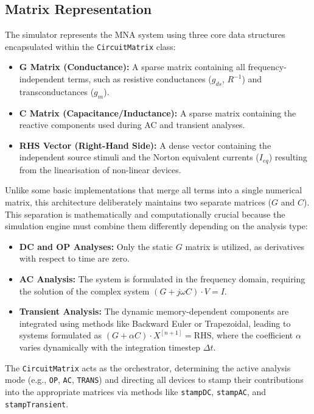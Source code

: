 \subsection{Matrix Representation}
The simulator represents the MNA system using three core data structures encapsulated within the \texttt{CircuitMatrix} class:
\begin{itemize}
    \item \textbf{G Matrix (Conductance):} A sparse matrix containing all frequency-independent terms, such as resistive conductances ($g_{ds}$, $R^{-1}$) and transconductances ($g_m$).
    \item \textbf{C Matrix (Capacitance/Inductance):} A sparse matrix containing the reactive components used during AC and transient analyses.
    \item \textbf{RHS Vector (Right-Hand Side):} A dense vector containing the independent source stimuli and the Norton equivalent currents ($I_{eq}$) resulting from the linearisation of non-linear devices.
\end{itemize}

Unlike some basic implementations that merge all terms into a single numerical matrix, this architecture deliberately maintains two separate matrices ($G$ and $C$). This separation is mathematically and computationally crucial because the simulation engine must combine them differently depending on the analysis type:
\begin{itemize}
    \item \textbf{DC and OP Analyses:} Only the static $G$ matrix is utilized, as derivatives with respect to time are zero.
    \item \textbf{AC Analysis:} The system is formulated in the frequency domain, requiring the solution of the complex system $(G + j\omega C) \cdot V = I$.
    \item \textbf{Transient Analysis:} The dynamic memory-dependent components are integrated using methods like Backward Euler or Trapezoidal, leading to systems formulated as $(G + \alpha C) \cdot X^{[n+1]} = \text{RHS}$, where the coefficient $\alpha$ varies dynamically with the integration timestep $\Delta t$.
\end{itemize}

The \texttt{CircuitMatrix} acts as the orchestrator, determining the active analysis mode (e.g., \texttt{OP}, \texttt{AC}, \texttt{TRANS}) and directing all devices to stamp their contributions into the appropriate matrices via methods like \texttt{stampDC}, \texttt{stampAC}, and \texttt{stampTransient}.

